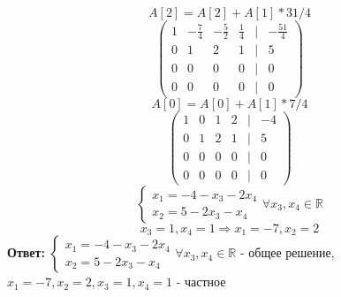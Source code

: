 \documentclass[a4paper]{article}
\newcommand{\mat}[1]{\begin{pmatrix} #1 \end{pmatrix}}
\newcommand{\case}[1]{\begin{cases} #1 \end{cases}}
\renewcommand{\r}{\Rightarrow}
\newcommand{\RR}{\mathbb{R}}
\begin{document}
\begin{enumerate}
\begin{enumerate}
        $$A[2] = A[2]+A[1]*31/4$$
        $$ \mat{1 & -\frac{7}{4} & -\frac{5}{2} & \frac{1}{4} & | & -\frac{51}{4} \\ 0 & 1 & 2 & 1 & | & 5 \\ 0 & 0 & 0 & 0 & | & 0 \\ 0 & 0 & 0 & 0 & | & 0} $$
        $$A[0] = A[0]+A[1]*7/4$$
        $$ \mat{1 & 0 & 1 & 2 & | & -4 \\ 0 & 1 & 2 & 1 & | & 5 \\ 0 & 0 & 0 & 0 & | & 0 \\ 0 & 0 & 0 & 0 & | & 0} $$
        $$\case{
            x_{1} = -4 -x_{3}-2x_{4}\\
            x_{2} = 5 - 2x_{3}-x_4
        } \forall x_3, x_4 \in \RR$$
        $$x_3 = 1, x_4 = 1 \r x_1 = -7, x_2 = 2$$
        \textbf{Ответ: }$\case{
            x_{1} = -4 -x_{3}-2x_{4}\\
            x_{2} = 5 - 2x_{3}-x_4
        } \forall x_3, x_4 \in \RR$ - общее решение, $x_1 = -7, x_2 = 2, x_3 = 1, x_4 = 1$ - частное

    \end{enumerate}

\end{enumerate}
\end{document}
